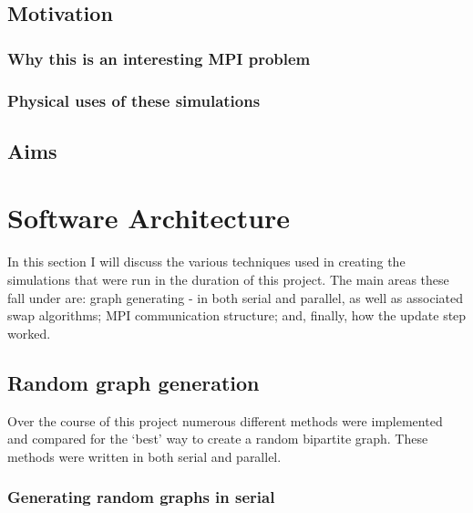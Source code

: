 \documentclass[pdftex,12pt,a4paper]{article}
\begin{document}

\subsection{Motivation}


\subsubsection{Why this is an interesting MPI problem}


\subsubsection{Physical uses of these simulations}


\subsection{Aims}

\newpage

\section{Software Architecture}

In this section I will discuss the various techniques used in creating the simulations that were run in the duration of this project. The main areas these fall under are: graph generating - in both serial and parallel, as well as associated swap algorithms; MPI communication structure; and, finally, how the update step worked.

\subsection{Random graph generation}

Over the course of this project numerous different methods were implemented and compared for the `best' way to create a random bipartite graph. These methods were written in both serial and parallel.

\subsubsection{Generating random graphs in serial}
\end{document}
